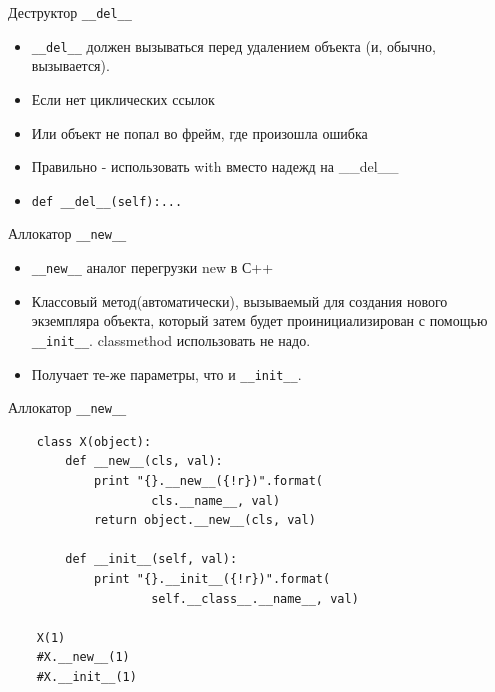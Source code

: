 \documentclass{article}
\begin{document}
\begin{center} Деструктор \lstinline!__del__! \end{center}
\begin{itemize}
    \item \lstinline!__del__! должен вызываться перед удалением объекта 
        (и, обычно, вызывается).
    \item Если нет циклических ссылок
    \item Или объект не попал во фрейм, где произошла ошибка
    \item Правильно - использовать with вместо надежд на \_\_del\_\_
    \item \lstinline!def __del__(self):...!
\end{itemize}
\newpage

\begin{center} Аллокатор \lstinline!__new__! \end{center}
\begin{itemize}
    \item \lstinline!__new__! аналог перегрузки new в С++
    \item Классовый метод(автоматически), вызываемый для создания 
        нового экземпляра объекта, который затем будет проинициализирован 
        с помощью \lstinline!__init__!. classmethod использовать не надо.
    \item Получает те-же параметры, что и \lstinline!__init__!.
\end{itemize}
\newpage
\begin{center} Аллокатор \lstinline!__new__! \end{center}
\begin{lstlisting}
    class X(object):
        def __new__(cls, val):
            print "{}.__new__({!r})".format(
                    cls.__name__, val)
            return object.__new__(cls, val)
        
        def __init__(self, val):
            print "{}.__init__({!r})".format(
                    self.__class__.__name__, val)

    X(1)
    #X.__new__(1)
    #X.__init__(1)
\end{lstlisting}
\newpage
\end{document}
